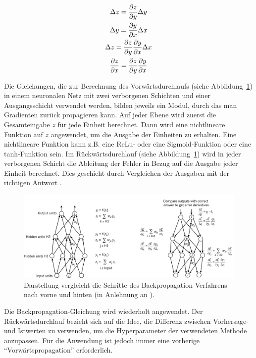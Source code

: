\begin{gather} \label{ChainRule}
    \Delta z =  \frac{\partial z}{\partial y} \Delta y \notag\\
    \Delta y = \frac{\partial y}{\partial x} \Delta x \notag\\
    \Delta z = \frac{\partial z}{\partial y}\frac{\partial y}{\partial x} \Delta x \notag\\
    \frac{\partial z}{\partial x} = \frac{\partial z}{\partial y} \frac{\partial y}{\partial x}
\end{gather}

Die Gleichungen, die zur Berechnung des Vorwärtsdurchlaufs (siehe Abbildung~\ref{BackProp}) in einem neuronalen Netz mit zwei verborgenen Schichten und einer Ausgangsschicht verwendet werden, bilden jeweils ein Modul, durch das man Gradienten zurück propagieren kann. Auf jeder Ebene wird zuerst die Gesamteingabe $z$ für jede Einheit berechnet. Dann wird eine nichtlineare Funktion auf $z$ angewendet, um die Ausgabe der Einheiten zu erhalten. Eine nichtlineare Funktion kann z.B. eine ReLu- oder eine Sigmoid-Funktion oder eine tanh-Funktion sein. Im Rückwärtsdurchlauf (siehe Abbildung~\ref{BackProp}) wird in jeder verborgenen Schicht die Ableitung der Fehler in Bezug auf die Ausgabe jeder Einheit berechnet. Dies geschieht durch Vergleichen der Ausgaben mit der richtigen Antwort \cite*{Lecun2015}.


\begin{figure}[H]
    \centering
    \includegraphics[width=13cm]{kapitel2/backprop.png}
    \caption[Die Vorwärts- und Rückwärtsschritte im Backpropagation]{Darstellung vergleicht die Schritte des Backpropagation Verfahrens nach vorne und hinten (in Anlehnung an \cite*{Lecun2015}).}
    \label{BackProp}
\end{figure}

Die Backpropagation-Gleichung wird wiederholt angewendet. Der Rückwärtsdurchlauf bezieht sich auf die Idee, die Differenz zwischen Vorhersage- und Istwerten zu verwenden, um die Hyperparameter der verwendeten Methode anzupassen. Für die Anwendung ist jedoch immer eine vorherige \enquote{Vorwärtspropagation} erforderlich.


